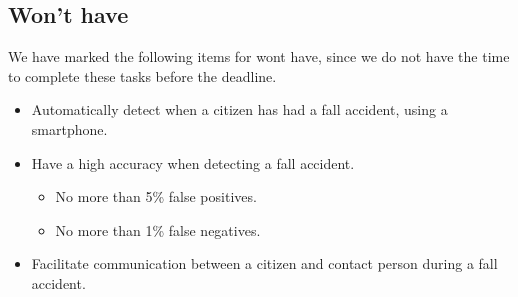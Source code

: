 \subsection{Won't have}

We have marked the following items for wont have, since we do not have the time to complete these tasks before the deadline.
\begin{itemize}
    \item Automatically detect when a citizen has had a fall accident, using a smartphone.
    \item Have a high accuracy when detecting a fall accident.
    \begin{itemize}
        \item No more than 5\% false positives.
        \item No more than 1\% false negatives.
    \end{itemize}
\end{itemize}



\begin{itemize}
    



    

    

    
    \item Facilitate communication between a citizen and contact person during a fall accident.


    

    
    
\end{itemize}





